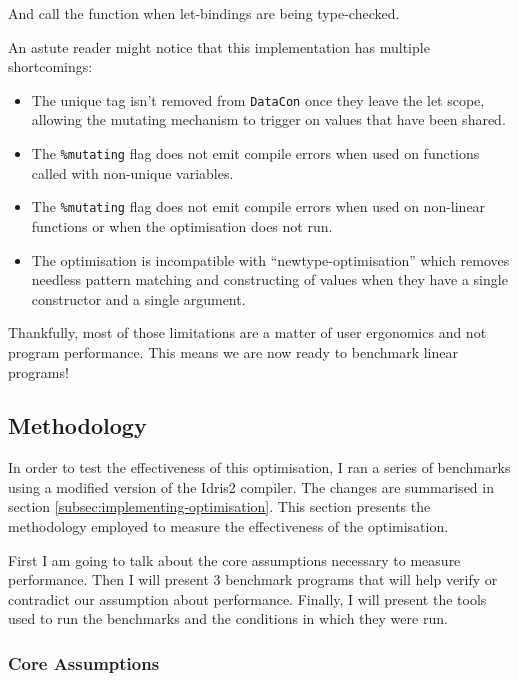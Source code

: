\documentclass[
]{article}
\providecommand{\tightlist}{%
  \setlength{\itemsep}{0pt}\setlength{\parskip}{0pt}}
\begin{document}
And call the function when let-bindings are being type-checked.

An astute reader might notice that this implementation has multiple
shortcomings:

\begin{itemize}
\tightlist
\item
  The unique tag isn't removed from \texttt{DataCon} once they leave the
  let scope, allowing the mutating mechanism to trigger on values that
  have been shared.
\item
  The \texttt{\%mutating} flag does not emit compile errors when used on
  functions called with non-unique variables.
\item
  The \texttt{\%mutating} flag does not emit compile errors when used on
  non-linear functions or when the optimisation does not run.
\item
  The optimisation is incompatible with ``newtype-optimisation'' which
  removes needless pattern matching and constructing of values when they
  have a single constructor and a single argument.
\end{itemize}

Thankfully, most of those limitations are a matter of user ergonomics
and not program performance. This means we are now ready to benchmark
linear programs!

\hypertarget{methodology}{%
\subsection{Methodology}\label{methodology}}

In order to test the effectiveness of this optimisation, I ran a series
of benchmarks using a modified version of the Idris2 compiler. The
changes are summarised in section
\ref{subsec:implementing-optimisation}. This section presents the
methodology employed to measure the effectiveness of the optimisation.

First I am going to talk about the core assumptions necessary to measure
performance. Then I will present 3 benchmark programs that will help
verify or contradict our assumption about performance. Finally, I will
present the tools used to run the benchmarks and the conditions in which
they were run.

\hypertarget{core-assumptions}{%
\subsubsection{Core Assumptions}\label{core-assumptions}}
\end{document}
